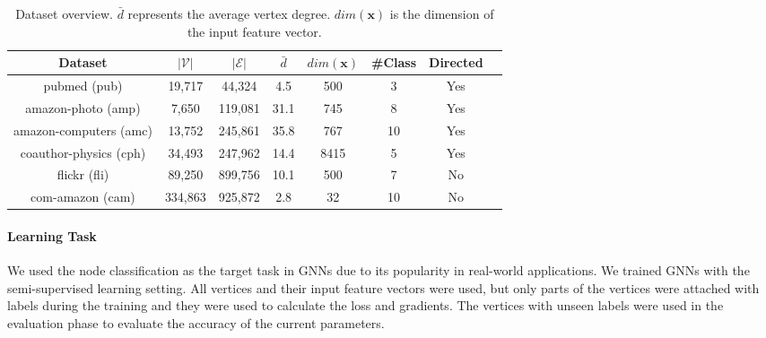 \begin{table}
    \centering
    \begin{tabular}{cccccccc}
        \toprule
        Dataset                                                 & $|\mathcal{V}|$ & $|\mathcal{E}|$ & $\bar{d}$ & $dim(\boldsymbol{x})$ & \#Class & Directed \\
        \midrule
        pubmed (pub) \cite{yang2016_revisiting_semisupervised}  & 19,717          & 44,324          & 4.5       & 500                   & 3       & Yes      \\
        amazon-photo (amp) \cite{shchur2018_pitfall_of_gnn}     & 7,650           & 119,081         & 31.1      & 745                   & 8       & Yes      \\
        amazon-computers (amc) \cite{shchur2018_pitfall_of_gnn} & 13,752          & 245,861         & 35.8      & 767                   & 10      & Yes      \\
        coauthor-physics (cph) \cite{shchur2018_pitfall_of_gnn} & 34,493          & 247,962         & 14.4      & 8415                  & 5       & Yes      \\
        flickr (fli) \cite{zeng2020_graphsaint}                 & 89,250          & 899,756         & 10.1      & 500                   & 7       & No       \\
        com-amazon (cam) \cite{yang2012_defining}               & 334,863         & 925,872         & 2.8       & 32                    & 10      & No       \\
        \bottomrule
    \end{tabular}
    \caption{Dataset overview. $\bar{d}$ represents the average vertex degree. $dim(\boldsymbol{x})$ is the dimension of the input feature vector.}
    \label{tab:dataset_overview}
\end{table}

\paragraph{Learning Task}
We used the node classification as the target task in GNNs due to its popularity in real-world applications.
We trained GNNs with the semi-supervised learning setting.
All vertices and their input feature vectors were used, but only parts of the vertices were attached with labels during the training and they were used to calculate the loss and gradients.
The vertices with unseen labels were used in the evaluation phase to evaluate the accuracy of the current parameters.

